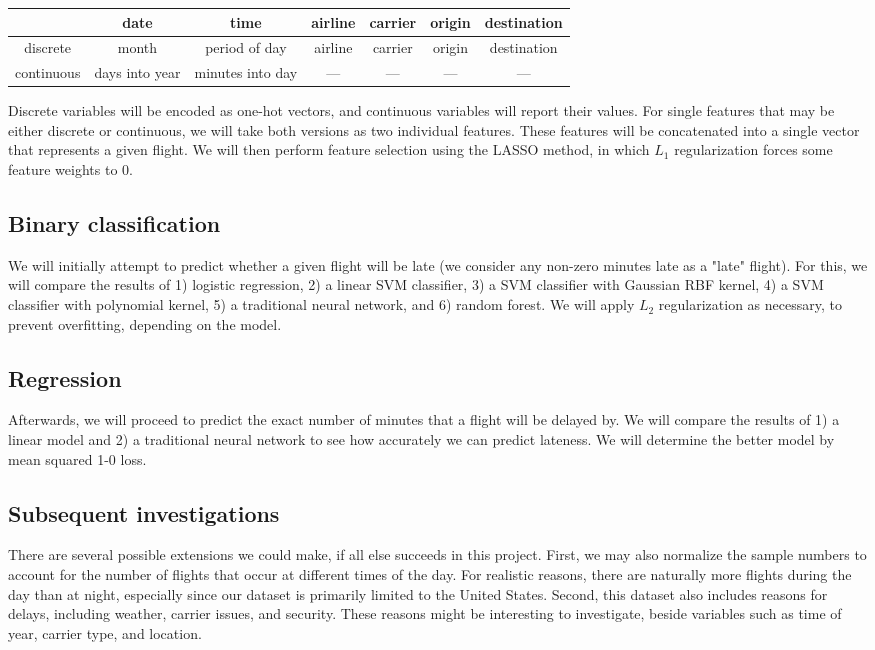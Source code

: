 \documentclass{article}
\begin{document}
\begin{tabular}{c||c|c|c|c|c|c}
\centering
			& date	& time		
			& airline	& carrier	& origin	& destination	 \\ \hline
			
discrete		& month	& period of day
			& airline	& carrier	& origin	& destination 	\\
continuous	& days into year	& minutes into day
			& ---		& ---		& ---		& ---			\\
\end{tabular}

Discrete variables will be encoded as one-hot vectors,
and continuous variables will report their values.
For single features that may be either discrete or continuous,
we will take both versions as two individual features.
These features will be concatenated into a single vector
that represents a given flight.
We will then perform feature selection using the LASSO method,
in which $L_1$ regularization forces some feature weights to 0.

\subsection{Binary classification}
We will initially attempt to predict whether a given flight will be late
(we consider any non-zero minutes late as a "late" flight).
For this, we will compare the results of
1) logistic regression,
2) a linear SVM classifier,
3) a SVM classifier with Gaussian RBF kernel,
4) a SVM classifier with polynomial kernel,
5) a traditional neural network, and
6) random forest.
We will apply $L_2$ regularization as necessary, to prevent overfitting,
depending on the model.

\subsection{Regression}
Afterwards, we will proceed to predict the exact number of minutes
that a flight will be delayed by.
We will compare the results of
1) a linear model and
2) a traditional neural network
to see how accurately we can predict lateness.
We will determine the better model by mean squared 1-0 loss.

\subsection{Subsequent investigations}
There are several possible extensions we could make,
if all else succeeds in this project.
First, we may also normalize the sample numbers
to account for the number of flights that occur
at different times of the day.
For realistic reasons, there are naturally more flights
during the day than at night, especially since our dataset
is primarily limited to the United States.
Second, this dataset also includes reasons for delays,
including weather, carrier issues, and security.
These reasons might be interesting to investigate,
beside variables such as time of year, carrier type, and
location.
\end{document}
